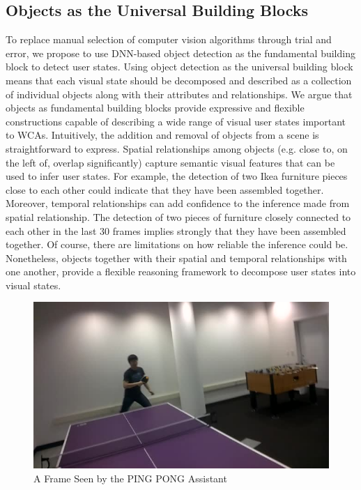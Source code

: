 \subsection{Objects as the Universal Building Blocks}

To replace manual selection of computer vision algorithms through trial and
error, we propose to use DNN-based object detection as the fundamental building
block to detect user states. Using object detection as the universal building
block means that each visual state should be decomposed and described as a
collection of individual objects along with their attributes and relationships.
We argue that objects as fundamental building blocks provide expressive and
flexible constructions capable of describing a wide range of visual user states
important to WCAs. Intuitively, the addition and removal of objects from a scene
is straightforward to express. Spatial relationships among objects (e.g. close
to, on the left of, overlap significantly) capture semantic visual features that
can be used to infer user states. For example, the detection of two Ikea
furniture pieces close to each other could indicate that they have been
assembled together. Moreover, temporal relationships can add confidence to the
inference made from spatial relationship. The detection of two pieces of
furniture closely connected to each other in the last 30 frames implies strongly
that they have been assembled together. Of course, there are limitations on how
reliable the inference could be. Nonetheless, objects together with their
spatial and temporal relationships with one another, provide a flexible
reasoning framework to decompose user states into visual states.

\begin{figure}
  \centering
  \includegraphics[trim={0 0 0 0},width=.9\linewidth]{FIGS/pingpong}
  \caption{A Frame Seen by the PING PONG Assistant}
  \label{figs:pingpong-frame}
\end{figure}

